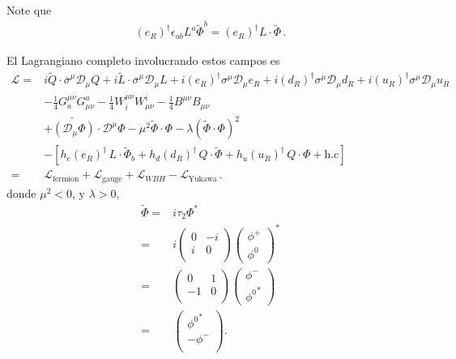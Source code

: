\begin{frame}
Note que
\begin{align}
  \left( e_R \right)^{\dagger}\epsilon_{ab}L^a\widetilde{\Phi}^b=\left( e_R \right)^{\dagger}L\cdot \widetilde{\Phi}\,.
\end{align}



El Lagrangiano completo involucrando estos campos es
\begin{align}
     \mathcal{L}=&i\widetilde{Q}\cdot \overline{\sigma}^\mu\mathcal{D}_\mu Q+i\widetilde{L}\cdot \overline{\sigma}^\mu\mathcal{D}_\mu L+
i(e_R)^{\dagger}\sigma^\mu\mathcal{D}_\mu {e_R}+i(d_R)^{\dagger}\sigma^\mu\mathcal{D}_\mu {d_R}+i(u_R)^{\dagger}\sigma^\mu\mathcal{D}_\mu {u_R}
\nonumber\\
     &-\tfrac{1}{4}G^{\mu\nu}_a G_{\mu\nu}^a-\tfrac{1}{4}W^{\mu\nu}_i W_{\mu\nu}^i-\tfrac{1}{4}B^{\mu\nu} B_{\mu\nu}\nonumber\\
     &+\widetilde{\left( \mathcal{D}_\mu{\Phi} \right)}\cdot\mathcal{D}^\mu\Phi-\mu^2\widetilde{\Phi}\cdot\Phi-\lambda \left( \widetilde{\Phi}\cdot\Phi \right)^2\nonumber\\
     &- \left[  h_e \left( e_R \right)^{\dagger}\,L\cdot \widetilde{\Phi}_b +
      h_d \left( d_R \right)^{\dagger}\,Q\cdot \widetilde{\Phi} +
      h_u \left( u_R \right)^{\dagger}\,Q\cdot {\Phi}+\text{h.c}\right]\nonumber\\
     =&\mathcal{L}_{\text{fermion}}+\mathcal{L}_{\text{gauge}}
     +\mathcal{L}_{WBH}
     -\mathcal{L}_{\text{Yukawa}}\,.
\end{align}
donde $\mu^2<0$, y $\lambda>0$,
\begin{align}
  \widetilde{\Phi}=&i\tau_2\Phi^* \nonumber\\
=&i
\begin{pmatrix}
  0 & -i \\
 i & 0\\
\end{pmatrix}
\begin{pmatrix}
  \phi^+\\
\phi^0
\end{pmatrix}^{*} \nonumber\\
=&\begin{pmatrix}
  0 & 1 \\
 -1 & 0\\
\end{pmatrix}
\begin{pmatrix}
  \phi^-\\
{\phi^0}^{*}
\end{pmatrix} \nonumber\\
=&\begin{pmatrix}
{\phi^0}^{*}\\
-  \phi^-\\
\end{pmatrix}.
\end{align}


\end{frame}
